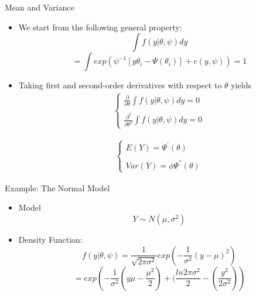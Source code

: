 \documentclass{beamer}
\begin{document}
\begin{frame}{Mean and Variance}
\begin{itemize}
\item We start from the following general property:
\[\int f(y|\theta,\psi)dy\]
\[=\int exp\left(\psi^{-1}[y\theta_i-\Psi(\theta_i)]+c(y,\psi)\right)=1\]
\item Taking first and second-order derivatives with respect to $\theta$ yields
	\begin{eqnarray*}
\left\{\begin{array}{l}
		\frac{\partial}{\partial\theta}\int f(y|\theta,\psi)dy=0\\\\
		\frac{\partial^{2}}{\partial\theta^{2}}\int f(y|\theta,\psi)dy=0
		\end{array}\right.
\end{eqnarray*}

	\begin{eqnarray*}
	\left\{\begin{array}{l}
		E(Y)=\Psi^{'}(\theta)\\\\
		Var(Y)=\phi\Psi^{''}(\theta)
	\end{array}\right.
\end{eqnarray*}

\end{itemize}
\end{frame}


\begin{frame}{Example: The Normal Model}
\begin{itemize}
\item Model
\[Y\sim N(\mu,\sigma^2)\]

\item Density Function:
\[f(y|\theta,\psi)=\frac{1}{\sqrt{2\pi\sigma^{2}}}exp\left(-\frac{1}{\sigma^{2}}(y-\mu)^{2}\right)
\]
\[=exp\left(-\frac{1}{\sigma^{2}}(y\mu-\frac{\mu^{2}}{2}) + (\frac{ln2\pi\sigma^{2}}{2}-(\frac{y^{2}}{2\sigma^{2}})\right)
\]
\end{itemize}
\end{frame}
\end{document}
